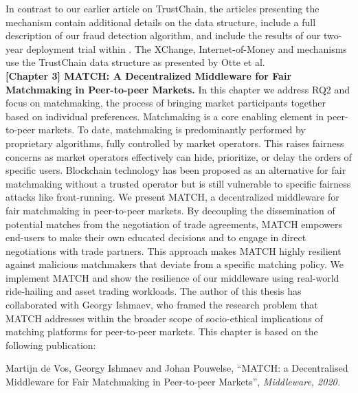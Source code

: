 In contrast to our earlier article on TrustChain, the articles presenting the \TrustChain{} mechanism contain additional details on the data structure, include a full description of our fraud detection algorithm, and include the results of our two-year deployment trial within \Tribler{}.
The XChange, Internet-of-Money and \Dappcoder{} mechanisms use the TrustChain data structure as presented by Otte et al.\\

\textbf{[Chapter 3] MATCH: A Decentralized Middleware for Fair Matchmaking in Peer-to-peer Markets.}
In this chapter we address RQ2 and focus on matchmaking, the process of bringing market participants together based on individual preferences.
Matchmaking is a core enabling element in peer-to-peer markets.
To date, matchmaking is predominantly performed by proprietary algorithms, fully controlled by market operators.
This raises fairness concerns as market operators effectively can hide, prioritize, or delay the orders of specific users.
Blockchain technology has been proposed as an alternative for fair matchmaking without a trusted operator but is still vulnerable to specific fairness attacks like front-running.
We present MATCH, a decentralized middleware for fair matchmaking in peer-to-peer markets.
By decoupling the dissemination of potential matches from the negotiation of trade agreements, MATCH empowers end-users to make their own educated decisions and to engage in direct negotiations with trade partners.
This approach makes MATCH highly resilient against malicious matchmakers that deviate from a specific matching policy.
We implement MATCH and show the resilience of our middleware using real-world ride-hailing and asset trading workloads.
The author of this thesis has collaborated with Georgy Ishmaev, who framed the research problem that MATCH addresses within the broader scope of socio-ethical implications of matching platforms for peer-to-peer markets.
This chapter is based on the following publication:

Martijn de Vos, Georgy Ishmaev and Johan Pouwelse, \enquote{MATCH: a Decentralised Middleware for Fair Matchmaking in Peer-to-peer Markets}, \emph{Middleware, 2020.}\\

